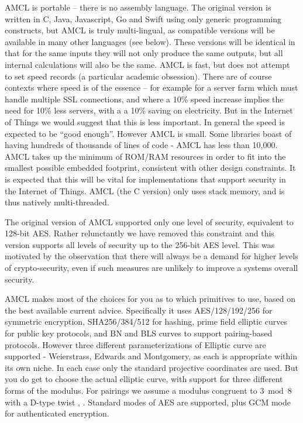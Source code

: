 \documentclass{llncs}
\begin{document}
AMCL is portable -- there is no assembly language. The original version is written in C, Java, Javascript, Go and Swift using only generic programming constructs, but AMCL is truly 
multi-lingual, as compatible 
versions will be available in many other languages (see below). These versions will be identical in that for the same inputs they will not only produce the same outputs, but all internal calculations will also be the same. 
AMCL is fast, but does not attempt to set speed records (a particular academic obsession). There are of course contexts where speed is of the essence -- for example for a server farm which must handle 
multiple SSL connections, and where a 10\% speed increase implies the need for 10\% less servers, with a a 10\% saving on electricity. But in the Internet of Things we would suggest that this is less 
important. In general the speed
is expected to be ``good enough''. However AMCL is small. Some libraries boast of having hundreds of thousands of lines of code - AMCL has less than 10,000. AMCL takes up the minimum of 
ROM/RAM resources in order to fit into the smallest possible embedded footprint, consistent with other design constraints. It is expected that this will be vital for implementations that 
support security in the Internet of Things. AMCL (the C version) only uses stack memory, and is thus natively multi-threaded.

The original version of AMCL supported only one level of security, equivalent to 128-bit AES. Rather relunctantly we have removed this constraint and this version supports all levels of security up to
the 256-bit AES level. This was motivated by the observation that there will always be a demand for higher levels of crypto-security, even if such measures are unlikely to improve a systems overall security. 

AMCL makes most 
of the choices for you as to which primitives to use, based on the best available current advice. Specifically it uses AES/128/192/256 for symmetric encryption, SHA256/384/512 for hashing, prime field elliptic
curves for public key protocols, and BN and BLS curves to support pairing-based protocols. However three different parameterizations of Elliptic curve are supported - Weierstrass, Edwards and 
Montgomery, as each is appropriate within its own niche. In each case only the standard projective coordinates are used. But you do get to 
choose the actual elliptic curve, with support for three different 
forms of the modulus. For pairings we assume a modulus congruent to $3 \bmod 8$ with a D-type twist \cite{barreto-naehrig}, \cite{barreto-lynn-scott}.
Standard modes of AES are supported, plus GCM mode for authenticated encryption.
\end{document}
